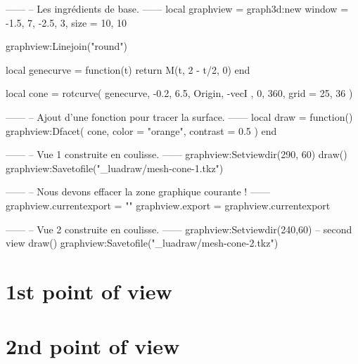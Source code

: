 \documentclass[varwidth]{standalone}
\begin{document}
\begin{luadraw}{}
------
-- Les ingrédients de base.
------
local graphview = graph3d:new{
  window = {-1.5, 7, -2.5, 3},
  size   = {10, 10}
}

graphview:Linejoin("round")

local genecurve = function(t)
  return M(t, 2 - t/2, 0)
end

local cone = rotcurve(
  genecurve, -0.2, 6.5,
  {
    Origin, -vecI
  },
  0, 360,
  {
    grid = {25, 36}
  })

------
-- Ajout d'une fonction pour tracer la surface.
------
local draw = function()
  graphview:Dfacet(
    cone,
    {
      color  = "orange",
      contrast = 0.5
    })
end

------
-- Vue 1 construite en coulisse.
------
graphview:Setviewdir(290, 60)
draw()
graphview:Savetofile("_luadraw/mesh-cone-1.tkz")

------
-- Nous devons effacer la zone graphique courante !
------
graphview.currentexport = {""}
graphview.export        = graphview.currentexport

------
-- Vue 2 construite en coulisse.
------
graphview:Setviewdir(240,60) -- second view
draw()
graphview:Savetofile("_luadraw/mesh-cone-2.tkz")
\end{luadraw}

\section*{1st point of view}




\section*{2nd point of view}


\end{document}
